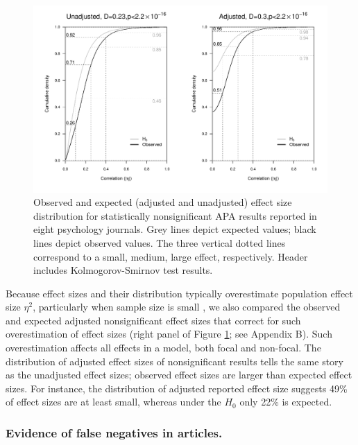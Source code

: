 \documentclass{article}
\begin{document}
\begin{figure}
\begin{center}
\includegraphics[width=\textwidth]{../figures/Fig3.pdf}
\end{center}
\caption{Observed and expected (adjusted and unadjusted) effect size distribution for statistically nonsignificant APA results reported in eight psychology journals. Grey lines depict expected values; black lines depict observed values. The three vertical dotted lines correspond to a small, medium, large effect, respectively. Header includes Kolmogorov-Smirnov test results.}
\label{fig:fig3}
\end{figure}

Because effect sizes and their distribution typically overestimate population effect size $\eta^2$, particularly when sample size is small \cite{Voelkle2007-at,Hedges1981-og}, we also compared the observed and expected adjusted nonsignificant effect sizes that correct for such overestimation of effect sizes (right panel of Figure \ref{fig:fig3}; see Appendix B). Such overestimation affects all effects in a model, both focal and non-focal. The distribution of adjusted effect sizes of nonsignificant results tells the same story as the unadjusted effect sizes; observed effect sizes are larger than expected effect sizes. For instance, the distribution of adjusted reported effect size suggests 49\% of effect sizes are at least small, whereas under the $H_0$ only 22\% is expected.

\subsubsection*{Evidence of false negatives in articles.}
\end{document}
